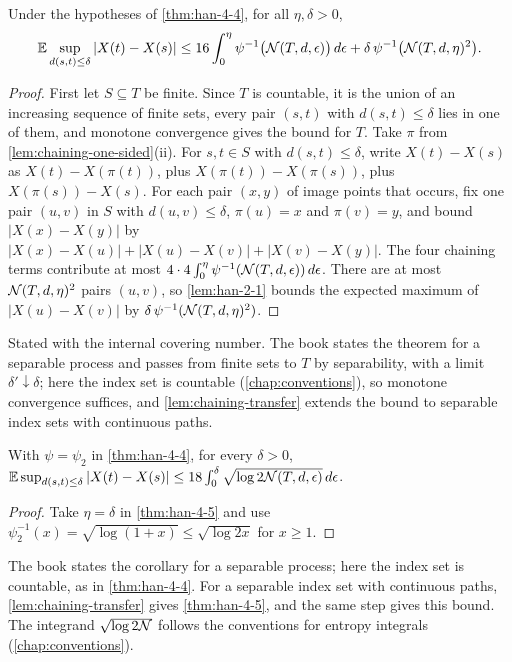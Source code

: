 \begin{theorem}
  \label{thm:han-4-5}
  Under the hypotheses of \cref{thm:han-4-4}, for all $\eta,\delta>0$,
  \[
    \mathbb{E}\sup_{d(s,t)\le\delta}|X(t)-X(s)|\le16\int_0^{\eta}\psi^{-1}\bigl(\mathcal{N}(T,d,\epsilon)\bigr)\,d\epsilon+\delta\,\psi^{-1}\bigl(\mathcal{N}(T,d,\eta)^2\bigr).
  \]
\end{theorem}
\begin{proof}
  First let $S\subseteq T$ be finite. Since $T$ is countable, it is the union of an increasing sequence of finite sets, every pair $(s,t)$ with $d(s,t)\le\delta$ lies in one of them, and monotone convergence gives the bound for $T$. Take $\pi$ from \cref{lem:chaining-one-sided}(ii). For $s,t\in S$ with $d(s,t)\le\delta$, write $X(t)-X(s)$ as $X(t)-X(\pi(t))$, plus $X(\pi(t))-X(\pi(s))$, plus $X(\pi(s))-X(s)$. For each pair $(x,y)$ of image points that occurs, fix one pair $(u,v)$ in $S$ with $d(u,v)\le\delta$, $\pi(u)=x$ and $\pi(v)=y$, and bound $|X(x)-X(y)|$ by $|X(x)-X(u)|+|X(u)-X(v)|+|X(v)-X(y)|$. The four chaining terms contribute at most $4\cdot4\int_0^\eta\psi^{-1}(\mathcal{N}(T,d,\epsilon))\,d\epsilon$. There are at most $\mathcal{N}(T,d,\eta)^2$ pairs $(u,v)$, so \cref{lem:han-2-1} bounds the expected maximum of $|X(u)-X(v)|$ by $\delta\,\psi^{-1}(\mathcal{N}(T,d,\eta)^2)$.
\end{proof}
\begin{remark}
  Stated with the internal covering number. The book states the theorem for a separable process and passes from finite sets to $T$ by separability, with a limit $\delta'\downarrow\delta$; here the index set is countable (\cref{chap:conventions}), so monotone convergence suffices, and \cref{lem:chaining-transfer} extends the bound to separable index sets with continuous paths.
\end{remark}

\begin{corollary}
  \label{cor:han-4-1}
  With $\psi=\psi_2$ in \cref{thm:han-4-4}, for every $\delta>0$,
  $\mathbb{E}\sup_{d(s,t)\le\delta}|X(t)-X(s)|\le18\int_0^\delta\sqrt{\log2\mathcal{N}(T,d,\epsilon)}\,d\epsilon$.
\end{corollary}
\begin{proof}
  Take $\eta=\delta$ in \cref{thm:han-4-5} and use $\psi_2^{-1}(x)=\sqrt{\log(1+x)}\le\sqrt{\log 2x}$ for $x\ge1$.
\end{proof}
\begin{remark}
  The book states the corollary for a separable process; here the index set is countable, as in \cref{thm:han-4-4}. For a separable index set with continuous paths, \cref{lem:chaining-transfer} gives \cref{thm:han-4-5}, and the same step gives this bound. The integrand $\sqrt{\log2\mathcal{N}}$ follows the conventions for entropy integrals (\cref{chap:conventions}).
\end{remark}

